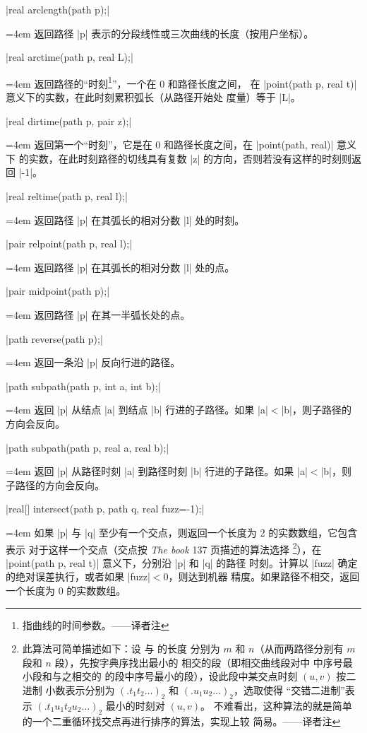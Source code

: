 \documentclass[nofonts,CJKnormalspaces]{ctexbook}[2009/05/20]
\makeatletter
\newenvironment{funclist}{\trivlist
  \parindent=0pt
\item[]
  \def\item{\medskip\par\leftskip=0pt}
  \def\go{\par\leftskip=4em}}
{\endtrivlist}
\newenvironment{typelist}{\itemize
  \let\old@item\@item
  \def\@item[##1]{\expandafter\old@item[\ttfamily\color{type!50!black}##1]}}
{\enditemize}
\newcommand\transnote[1]{\footnote{#1——译者注}}
\makeatother
\begin{document}
\begin{typelist}
\begin{funclist}
\item |real arclength(path p);| \go
  返回路径 |p| 表示的分段线性或三次曲线的长度（按用户坐标）。

\item |real arctime(path p, real L);| \go
  返回路径的“时刻\transnote{指曲线的时间参数。}”，一个在 0 和路径长度之间，
  在 |point(path p, real t)| 意义下的实数，在此时刻累积弧长（从路径开始处
  度量）等于 |L|。

\item |real dirtime(path p, pair z);| \go
  返回第一个“时刻”，它是在 0 和路径长度之间，在 |point(path, real)| 意义下
  的实数，在此时刻路径的切线具有复数 |z| 的方向，否则若没有这样的时刻则返回
  |-1|。

\item |real reltime(path p, real l);| \go
  返回路径 |p| 在其弧长的相对分数 |l| 处的时刻。

\item |pair relpoint(path p, real l);| \go
  返回路径 |p| 在其弧长的相对分数 |l| 处的点。

\item |pair midpoint(path p);| \go
  返回路径 |p| 在其一半弧长处的点。

\item |path reverse(path p);| \go
  返回一条沿 |p| 反向行进的路径。

\item |path subpath(path p, int a, int b);| \go
  返回 |p| 从结点 |a| 到结点 |b| 行进的子路径。如果 |a|${}<{}$|b|，则子路径的
  方向会反向。

\item |path subpath(path p, real a, real b);| \go
  返回 |p| 从路径时刻 |a| 到路径时刻 |b| 行进的子路径。如果 |a|${}<{}$|b|，则
  子路径的方向会反向。

\item |real[] intersect(path p, path q, real fuzz=-1);| \go
  如果 |p| 与 |q| 至少有一个交点，则返回一个长度为 2 的实数数组，它包含表示
  对于这样一个交点（交点按 \textit{The \MF{}book} 137 页描述的算法选择%
  \transnote{此算法可简单描述如下：设  与  的长度
  分别为 $m$ 和 $n$（从而两路径分别有 $m$ 段和 $n$ 段），先按字典序找出最小的
  相交的段（即相交曲线段对中 \inlinecode{p} 中序号最小段和与之相交的
  \inlinecode{q} 的段中序号最小的段），设此段中某交点时刻 $(u, v)$ 按二进制
  小数表示分别为 $(.t_1 t_2 \ldots)_2$ 和 $(.u_1 u_2 \ldots)_2$，选取使得
  “交错二进制”表示 $(.t_1 u_1 t_2 u_2 \ldots)_2$ 最小的时刻对 $(u, v)$。
  不难看出，这种算法的就是简单的一个二重循环找交点再进行排序的算法，实现上较
  简易。}），在 |point(path p, real t)| 意义下，分别沿 |p| 和 |q| 的路径
  时刻。计算以 |fuzz| 确定的绝对误差执行，或者如果 |fuzz|${}<0$，则达到机器
  精度。如果路径不相交，返回一个长度为 0 的实数数组。


\end{funclist}
\end{typelist}
\end{document}
